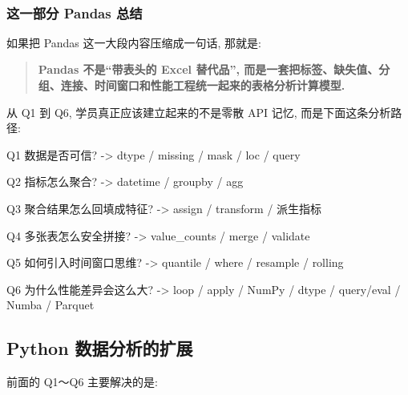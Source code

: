 \documentclass[11pt]{article}
\newenvironment{Shaded}{}{}
\newcommand{\NormalTok}[1]{{#1}}
\begin{document}
    \begin{center}
    \end{center}
    { \hspace*{\fill} \\}
    
    \subsubsection{这一部分 Pandas
总结}\label{ux8fd9ux4e00ux90e8ux5206-pandas-ux603bux7ed3}

    如果把 Pandas 这一大段内容压缩成一句话, 那就是:

\begin{quote}
\textbf{Pandas 不是``带表头的 Excel 替代品'',
而是一套把标签、缺失值、分组、连接、时间窗口和性能工程统一起来的表格分析计算模型.}
\end{quote}

从 Q1 到 Q6, 学员真正应该建立起来的不是零散 API 记忆,
而是下面这条分析路径:

\begin{Shaded}
\begin{Highlighting}[]
\NormalTok{Q1 数据是否可信? }
\NormalTok{    {-}\textgreater{} dtype / missing / mask / loc / query}

\NormalTok{Q2 指标怎么聚合? }
\NormalTok{    {-}\textgreater{} datetime / groupby / agg}

\NormalTok{Q3 聚合结果怎么回填成特征? }
\NormalTok{    {-}\textgreater{} assign / transform / 派生指标}

\NormalTok{Q4 多张表怎么安全拼接? }
\NormalTok{    {-}\textgreater{} value\_counts / merge / validate}

\NormalTok{Q5 如何引入时间窗口思维? }
\NormalTok{    {-}\textgreater{} quantile / where / resample / rolling}

\NormalTok{Q6 为什么性能差异会这么大? }
\NormalTok{    {-}\textgreater{} loop / apply / NumPy / dtype / query/eval / Numba / Parquet}
\end{Highlighting}
\end{Shaded}

    \subsection{Python
数据分析的扩展}\label{python-ux6570ux636eux5206ux6790ux7684ux6269ux5c55}

    前面的 Q1～Q6 主要解决的是:
\end{document}
